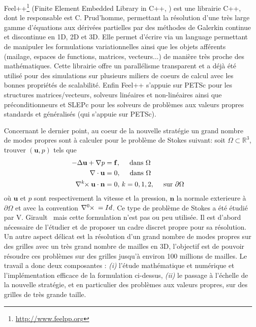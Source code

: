 \documentclass[12pt]{article}
\newcommand{\curlk}[1][k]{\ensuremath{\nabla^{#1}\hspace{-.3em}\times}\xspace}
\begin{document}
Feel++\footnote{\url{http://www.feelpp.org}} (Finite Element Embedded Library in C++,
\cite{prud2012feel++,feelpp098:10046} ) est une librairie C++,
dont le responsable est C. Prud'homme, permettant la résolution d'une très large
gamme d'équations aux dérivées partielles par des méthodes de Galerkin continue
et discontinue en 1D, 2D et 3D. Elle permet d'écrire via un language permettant
de manipuler les formulations variationnelles ainsi que les objets afférents
(mailage, espaces de functions, matrices, vecteurs...) de manière très proche
des mathématiques. Cette librairie offre un parallélisme transparent et a déjà
été utilisé pour des simulations sur plusieurs miliers de coeurs de calcul avec
les bonnes propriétés de scalabilité. Enfin Feel++ s'appuie sur PETSc pour les
structures matrices/vecteurs, solveurs linéaires et non-linéaires ainsi que
préconditionneurs et SLEPc pour les solveurs de problèmes aux valeurs propres
standards et généralisés (qui s'appuie sur PETSc).

Concernant le dernier point, au coeur de la nouvelle stratégie un grand nombre
de modes propres sont à calculer pour le problème de Stokes suivant: soit
$\Omega \subset \mathbb{R}^3$, trouver $(\mathbf{u},p)$ tels que
\begin{align}
  \label{eq:1}
  -\Delta \mathbf{u} + \nabla p &= \mathbf{f},\quad \mbox{ dans } \Omega\\
  \nabla \cdot \mathbf{u} &= 0,\quad \mbox{ dans } \Omega\\
  \curlk{} \mathbf{u} \cdot \mathbf{n} &= 0,\, k=0,1,2,\quad \mbox{ sur
  } \partial \Omega
\end{align}
où $\mathbf{u}$ et $p$ sont respectivement la vitesse et la pression,
$\mathbf{n}$ la normale exterieure à $\partial \Omega$ et avec la convention
$\curlk[0]{} = Id$. Ce type de problème de Stokes a été étudié par
V. Girault~\cite{girault90-1} mais cette formulation n'est pas ou peu
utilisée. Il est d'abord nécessaire de l'étudier et de proposer un cadre discret
propre pour sa résolution. Un autre aspect délicat est la résolution d'un grand
nombre de modes propres sur des grilles avec un très grand nombre de mailles en
3D, l'objectif est de pouvoir résoudre ces problèmes sur des grilles jusqu'à
environ 100 millions de mailles.  Le travail a donc deux composantes :
\textit{(i)} l'étude mathématique et numérique et l'implémentation efficace de
la formulation ci-dessus, \textit{(ii)} le passage à l'échelle de la nouvelle
stratégie, et en particulier des problèmes aux valeurs propres, sur des grilles
de très grande taille.
\end{document}
